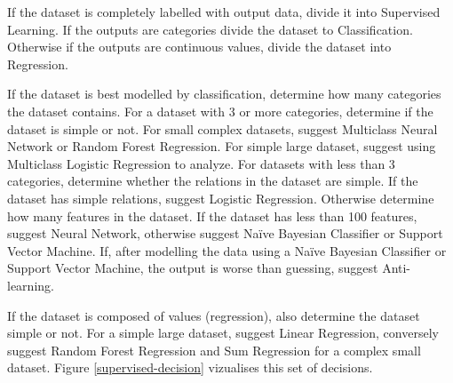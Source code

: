 \documentclass[a4paper,titlepage]{article}
\begin{document}
If the dataset is completely labelled with output data, divide it into Supervised Learning.
If the outputs are categories divide the dataset to Classification.
Otherwise if the outputs are continuous values, divide the dataset into Regression.

If the dataset is best modelled by classification, determine how many categories the dataset contains.
For a dataset with 3 or more categories, determine if the dataset is simple or not.
For small complex datasets, suggest Multiclass Neural Network or Random Forest Regression.
For simple large dataset, suggest using Multiclass Logistic Regression to analyze.
For datasets with less than 3 categories, determine whether the relations in the dataset are simple.
If the dataset has simple relations, suggest Logistic Regression. Otherwise determine how many features in the dataset.
If the dataset has less than 100 features, suggest Neural Network, otherwise suggest Naïve Bayesian Classifier or Support Vector Machine.
If, after modelling the data using a Naïve Bayesian Classifier or Support Vector Machine, the output is worse than guessing, suggest Anti-learning.

If the dataset is composed of values (regression), also determine the dataset simple or not. For a simple large dataset, suggest Linear Regression, conversely suggest Random Forest Regression and Sum Regression for a complex small dataset.
Figure \ref{supervised-decision} vizualises this set of decisions.
\end{document}
